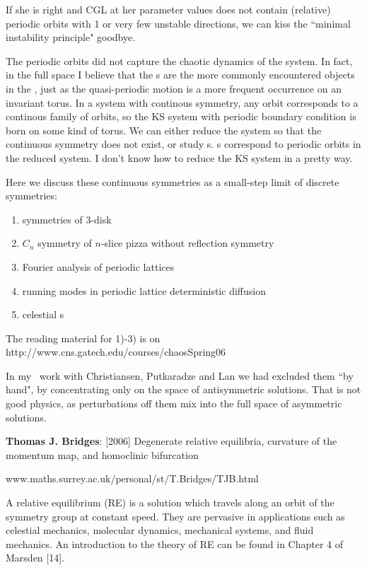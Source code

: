 If she is right and CGL at her parameter values does not contain
(relative) periodic orbits with 1 or very few unstable directions, we can
kiss the ``minimal instability principle" goodbye.

The
periodic orbits
did not capture the chaotic dynamics of the system. In fact, in the full
space I believe that the {\rpo s} are the more commonly
encountered objects in the \statesp, just as the quasi-periodic motion is a
more frequent occurrence on an invariant torus. In a system with continous
symmetry, any orbit corresponds to a continous family of orbits, so the KS
system with periodic boundary condition is born on some kind of torus. We can
either reduce the system so that the continuous symmetry does not exist, or
study {\rpo s}. {\Rpo s} correspond to periodic
orbits in the reduced system. I don't know how to reduce the KS system in a
pretty way.


        Here we discuss these continuous symmetries as
a small-step limit of discrete symmetries:

\begin{enumerate}
\item
        symmetries of 3-disk
\item
        $C_n$ symmetry of $n$-slice pizza without reflection symmetry
\item
        Fourier analysis of periodic lattices
\item
        running modes in periodic lattice deterministic
           diffusion
\item
    celestial {\rpo s}
\end{enumerate}

The reading material for 1)-3) is on
http://www.cns.gatech.edu/courses/chaosSpring06

In my \KS\ work with Christiansen, Putkaradze and Lan we
had excluded them ``by hand", by concentrating only on the space of
antisymmetric solutions. That is not good physics, as perturbations off
them mix into the full space of asymmetric solutions.

{\bf Thomas J. Bridges}: [2006]  Degenerate relative equilibria,
           curvature of the momentum map, and homoclinic bifurcation

www.maths.surrey.ac.uk/personal/st/T.Bridges/TJB.html

A relative equilibrium (RE) is a solution which travels along an orbit of the symmetry group
at constant speed. They are pervasive in applications such as celestial mechanics, molecular
dynamics, mechanical systems, and fluid mechanics. An introduction to the theory of RE can
be found in Chapter 4 of Marsden [14].

